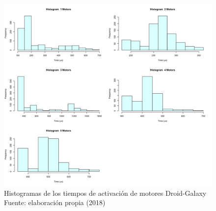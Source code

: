 \begin{figure}
 \begin{center} 
   	\includegraphics[width=1.0\textwidth]{evaluation/graphics/Droid/Galaxy/HistMotorsDroidGalaxy.png} 
   	\captionsetup{justification=centering}
    \caption[Histogramas de los tiempos de activación de motores Droid-Galaxy]{Histogramas de los tiempos de activación de motores Droid-Galaxy\\Fuente: elaboración propia (2018)} 
    \label{fig:droid-galaxy-hist-motors}
  \end{center}
\end{figure}

